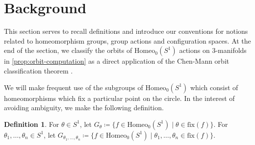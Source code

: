 \documentclass[10pt, oneside]{article}
\newcommand{\homeo}[1][S^1]{\text{Homeo}_0(#1)}
\newcommand{\conf}[2][S^1]{\text{Conf}_{#2}(#1)}
\newcommand{\dimn}[1]{\text{dim}(#1)}
\theoremstyle{definition}
\newtheorem{defn}{Definition}[section]
\theoremstyle{definition}
\begin{document}



\section{Background}\label{sec:background}
This section serves to recall definitions and introduce our conventions for notions related to homeomorphism groups, group actions and configuration spaces. At the end of the section, we classify the orbits of $\homeo$ actions on 3-manifolds in \cref{prop:orbit-computation} as a direct application of the Chen-Mann orbit classification theorem \cite{chen:StructureTheorems}.

We will make frequent use of the subgroups of $\homeo$ which consist of homeomorphisms which fix a particular point on the circle. In the interest of avoiding ambiguity, we make the following definition.

\begin{defn}
     For $\theta\in S^1$, let $G_\theta\coloneqq\{f\in\homeo[S^1]\;\vert\; \theta\in\text{fix}(f)\}$.
     For $\theta_1,\dots,\theta_n\in S^1$, let $G_{\theta_1,\dots,\theta_n}\coloneqq \{f\in\homeo\;\vert\; \theta_1,\dots,\theta_n\in\text{fix}(f)\}$.
\end{defn}
\end{document}
